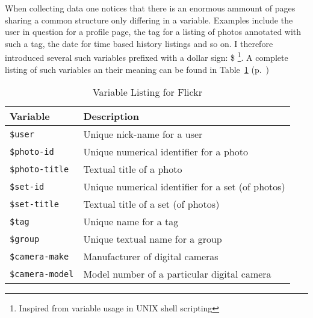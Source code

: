 \documentclass[11pt,a4paper]{article}
\newcommand{\var}[1]{\texttt{\${#1}}}
\begin{document}
When collecting data one notices that there is an enormous ammount of pages
sharing a common structure only differing in a variable. Examples include
the user in question for a profile page, the tag for a listing of photos
annotated with such a tag, the date for time based history listings and so on.
I therefore introduced several such variables prefixed with a dollar sign: \$
\footnote{Inspired from variable usage in UNIX shell scripting}. A complete
listing of such variables an their meaning can be found in
Table~\ref{table:flickr.variable.list}
(p.~\pageref{table:flickr.variable.list})

\begin{table}[h!b!p!]
  \begin{center}
    \begin{small}

      \caption{Variable Listing for Flickr}
      \label{table:flickr.variable.list}

      \begin{tabular}{lp{8cm}}

        \toprule
        Variable & Description \\
        \midrule

        \var{user} &
        Unique nick-name for a user \\

        \var{photo-id} &
        Unique numerical identifier for a photo \\

        \var{photo-title} &
        Textual title of a photo \\

        \var{set-id} &
        Unique numerical identifier for a set (of photos) \\

        \var{set-title} &
        Textual title of a set (of photos) \\

        \var{tag} &
        Unique name for a tag \\

        \var{group} &
        Unique textual name for a group \\

        \var{camera-make} &
        Manufacturer of digital cameras \\

        \var{camera-model} &
        Model number of a particular digital camera \\


\end{tabular}
\end{small}
\end{center}
\end{table}
\end{document}
